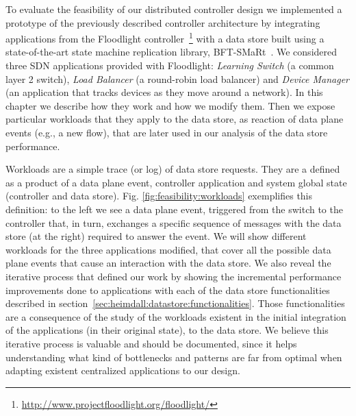 

\label{sec:feasibility:apps}
\glsresetall

To evaluate the feasibility of our distributed controller design we implemented a prototype of the previously described controller architecture by integrating applications from the Floodlight controller~\footnote{\url{http://www.projectfloodlight.org/floodlight/}} with a data store built using a state-of-the-art state machine replication library, BFT-SMaRt~\cite{smart-tr,bft-smart:2011:High-perfomance}.
We considered three SDN applications provided with Floodlight: \emph{Learning Switch}  (a common layer 2 switch), \emph{Load   Balancer} (a round-robin load balancer) and \emph{Device Manager} (an application that tracks devices as they move around a network).
In this chapter we describe how they work and how we modify them. 
Then we expose particular workloads that they apply to the data store, as reaction of data plane events (e.g., a new flow), that are later used in our analysis of the data store performance.





Workloads are a simple trace (or log) of data store requests. They are a defined as a product of a data plane event, controller application and system global state (controller and data store).
Fig. \ref{fig:feasibility:workloads} exemplifies this definition: to the left we see a data plane event, triggered from the switch to the controller that, in turn, exchanges a specific sequence of messages with the data store (at the right) required to answer the event.
We will show different workloads for the three applications modified, that cover all the possible data plane events that cause an interaction with the data store. We also reveal the iterative process that defined our work by showing the incremental performance improvements done to applications with each of the data store functionalities described in section~\ref{sec:heimdall:datastore:functionalities}. Those functionalities are   a consequence of the study of the workloads existent in the initial integration of the applications (in their original state), to the data store. We believe this iterative process is valuable and should be documented, since it helps understanding what kind of bottlenecks and patterns are far from optimal when adapting existent centralized applications to our design.  

